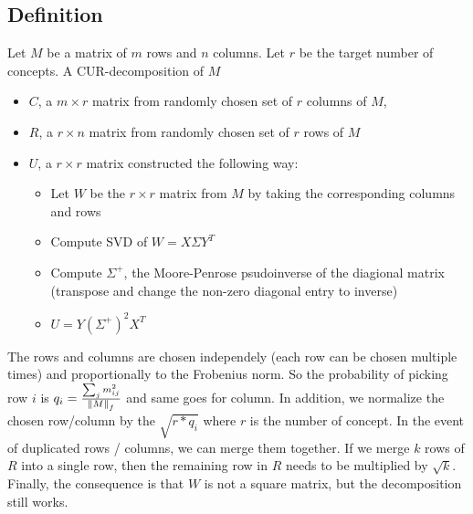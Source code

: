 \subsection{Definition} 
Let $M$ be a matrix of $m$ rows and $n$ columns. Let $r$ be the target number of concepts. A CUR-decomposition of $M$
    \begin{itemize}
        \item $C$, a $m\times r$ matrix from randomly chosen set of $r$ columns of $M$,  
        \item $R$, a $r \times n$ matrix from randomly chosen set of $r$ rows of $M$ 
        \item $U$, a $r \times r$ matrix constructed the following way: 
            \begin{itemize}
                \item Let $W$ be the $r \times r$ matrix from $M$ by taking the corresponding columns and rows 
                \item Compute SVD of $W = X \Sigma Y^T$
                \item Compute $\Sigma^+$, the Moore-Penrose psudoinverse of the diagional matrix (transpose and change the non-zero diagonal entry to inverse)
                \item $U = Y (\Sigma^+)^2X^T$
            \end{itemize}
    \end{itemize}
The rows and columns are chosen independely (each row can be chosen multiple times) and proportionally to the Frobenius norm. So the probability of picking row $i$ is $q_i = \frac{\sum_{j} m_{ij}^2}{\left\lVert M\right\rVert_f}$ and same goes for column. In addition, we normalize the chosen row/column by the $\sqrt{r * q_i}$ where $r$ is the number of concept. In the event of duplicated rows / columns, we can merge them together. If we merge $k$ rows of $R$ into a single row, then the remaining row in $R$ needs to be multiplied by $\sqrt{k}$. Finally, the consequence is that $W$ is not a square matrix, but the decomposition still works. 